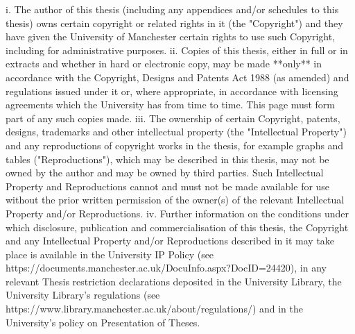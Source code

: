 i.  The author of this thesis (including any appendices and/or schedules to this thesis) owns certain copyright or related rights in it (the "Copyright") and they have given the University of Manchester certain rights to use such Copyright, including for administrative purposes.
ii.  Copies of this thesis, either in full or in extracts and whether in hard or electronic copy, may be made **only** in accordance with the Copyright, Designs and Patents Act 1988 (as amended) and regulations issued under it or, where appropriate, in accordance with licensing agreements which the University has from time to time. This page must form part of any such copies made.
iii.  The ownership of certain Copyright, patents, designs, trademarks and other intellectual property (the "Intellectual Property") and any reproductions of copyright works in the thesis, for example graphs and tables ("Reproductions"), which may be described in this thesis, may not be owned by the author and may be owned by third parties. Such Intellectual Property and Reproductions cannot and must not be made available for use without the prior written permission of the owner(s) of the relevant Intellectual Property and/or Reproductions.
iv.  Further information on the conditions under which disclosure, publication and commercialisation of this thesis, the Copyright and any Intellectual Property and/or Reproductions described in it may take place is available in the University IP Policy (see https://documents.manchester.ac.uk/DocuInfo.aspx?DocID=24420), in any relevant Thesis restriction declarations deposited in the University Library, the University Library’s regulations (see https://www.library.manchester.ac.uk/about/regulations/) and in the University’s policy on Presentation of Theses.